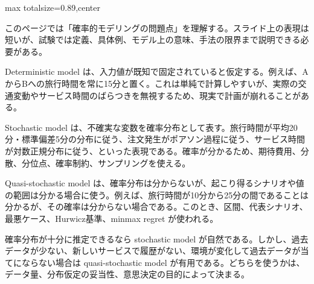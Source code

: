 \begin{minipage}[t]{0.58\textwidth}
\begin{adjustbox}{max totalsize={\textwidth}{0.89\textheight},center}
\begin{minipage}{\textwidth}\scriptsize
{}このページでは「確率的モデリングの問題点」を理解する。スライド上の表現は短いが、試験では定義、具体例、モデル上の意味、手法の限界まで説明できる必要がある。\par
Deterministic model は、入力値が既知で固定されていると仮定する。例えば、AからBへの旅行時間を常に15分と置く。これは単純で計算しやすいが、実際の交通変動やサービス時間のばらつきを無視するため、現実で計画が崩れることがある。\par
Stochastic model は、不確実な変数を確率分布として表す。旅行時間が平均20分・標準偏差5分の分布に従う、注文発生がポアソン過程に従う、サービス時間が対数正規分布に従う、といった表現である。確率が分かるため、期待費用、分散、分位点、確率制約、サンプリングを使える。\par
Quasi-stochastic model は、確率分布は分からないが、起こり得るシナリオや値の範囲は分かる場合に使う。例えば、旅行時間が10分から25分の間であることは分かるが、その確率は分からない場合である。このとき、区間、代表シナリオ、最悪ケース、Hurwicz基準、minmax regret が使われる。\par
確率分布が十分に推定できるなら stochastic model が自然である。しかし、過去データが少ない、新しいサービスで履歴がない、環境が変化して過去データが当てにならない場合は quasi-stochastic model が有用である。どちらを使うかは、データ量、分布仮定の妥当性、意思決定の目的によって決まる。\par

\end{minipage}
\end{adjustbox}
\end{minipage}
